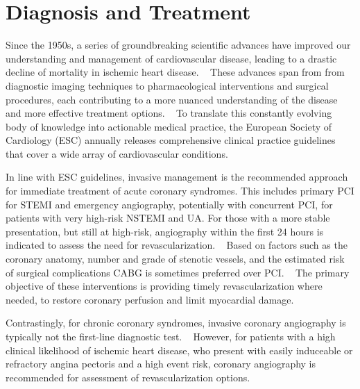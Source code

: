 \section{Diagnosis and Treatment}

Since the 1950s, a series of groundbreaking scientific advances have improved 
our understanding and management of cardiovascular disease, leading to a 
drastic decline of mortality in ischemic heart disease.
~\autocite{nabelTale2012}
These advances span from from diagnostic imaging techniques to pharmacological
interventions and surgical procedures, each contributing to a more nuanced
understanding of the disease and more effective treatment options.
~\autocite{nabelTale2012}
To translate this constantly evolving body of knowledge into actionable medical
practice, the European Society of Cardiology (ESC) annually releases
comprehensive clinical practice guidelines that cover a wide array of
cardiovascular conditions.

In line with ESC guidelines, 
invasive management is the recommended approach
for immediate treatment of acute coronary syndromes.
This includes primary \ac{PCI}%
for \ac{STEMI} and emergency angiography, 
potentially with concurrent \ac{PCI},
for patients with very high-risk \ac{NSTEMI} and \ac{UA}.
For those with a more stable presentation, but still at high-risk, 
angiography within the first 24 hours is indicated to
assess the need for revascularization. 
~\autocite{byrne20232023}
Based on factors such as the coronary anatomy, 
number and grade of stenotic vessels, 
and the estimated risk of surgical complications
\ac{CABG} is sometimes preferred over \ac{PCI}.
~\autocite{neumann20182019}
The primary objective of these interventions 
is providing timely revascularization where needed,
to restore coronary perfusion and limit myocardial damage.

Contrastingly, for chronic coronary syndromes,
invasive coronary angiography is typically not 
the first-line diagnostic test.
~\autocite{knuuti20192020}
However, for patients with a high clinical likelihood of ischemic heart
disease, who present with easily induceable or refractory angina pectoris 
and a high event risk, coronary angiography is recommended for assessment of
revascularization options.  
~\autocite{knuuti20192020}

